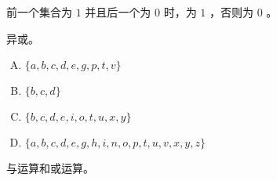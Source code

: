 {{        %
        \begin{practices}
            前一个集合为 $1$ 并且后一个为 $0$ 时，为 $1$ ，否则为 $0$ 。
        \end{practices}

        \begin{practices}
            异或。
        \end{practices}

        \begin{practices}
            \begin{enumerate}[A.]
                \item $\{a, b, c, d, e, g, p, t, v\}$
                \item $\{b, c, d\}$
                \item $\{b, c, d, e, i, o, t, u, x, y\}$
                \item $\{a, b, c, d, e, g, h, i, n, o, p, t, u, v, x, y, z\}$
            \end{enumerate}
        \end{practices}

        \begin{practices}
            与运算和或运算。
        \end{practices}

        \begin{practices}
        \end{practices}
    }
}
